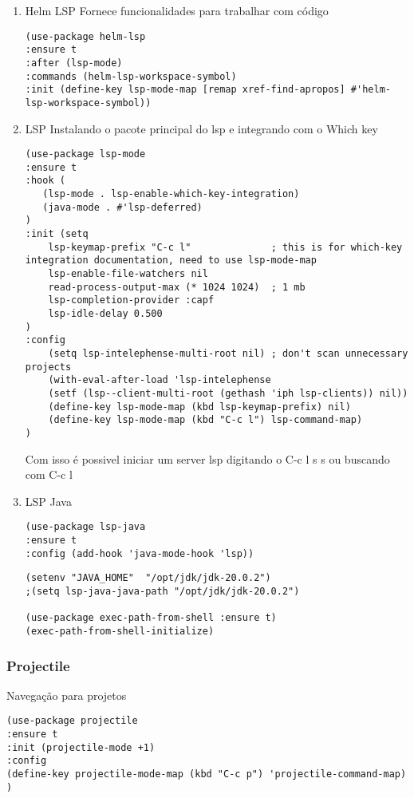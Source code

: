 \documentclass[11pt]{article}
\begin{document}
\begin{enumerate}
\item Helm LSP
\label{sec:org93d8a4e}
Fornece funcionalidades para trabalhar com código
\begin{verbatim}
(use-package helm-lsp
:ensure t
:after (lsp-mode)
:commands (helm-lsp-workspace-symbol)
:init (define-key lsp-mode-map [remap xref-find-apropos] #'helm-lsp-workspace-symbol))
\end{verbatim}

\item LSP
\label{sec:orgee78687}
Instalando o pacote principal do lsp e integrando com o Which key
\begin{verbatim}
(use-package lsp-mode
:ensure t
:hook (
   (lsp-mode . lsp-enable-which-key-integration)
   (java-mode . #'lsp-deferred)
)
:init (setq 
    lsp-keymap-prefix "C-c l"              ; this is for which-key integration documentation, need to use lsp-mode-map
    lsp-enable-file-watchers nil
    read-process-output-max (* 1024 1024)  ; 1 mb
    lsp-completion-provider :capf
    lsp-idle-delay 0.500
)
:config 
    (setq lsp-intelephense-multi-root nil) ; don't scan unnecessary projects
    (with-eval-after-load 'lsp-intelephense
    (setf (lsp--client-multi-root (gethash 'iph lsp-clients)) nil))
	(define-key lsp-mode-map (kbd lsp-keymap-prefix) nil)
	(define-key lsp-mode-map (kbd "C-c l") lsp-command-map)
)
\end{verbatim}
Com isso é possivel iniciar um server lsp digitando o C-c l s s ou buscando com C-c l

\item LSP Java
\label{sec:org9a444b8}
\begin{verbatim}
(use-package lsp-java 
:ensure t
:config (add-hook 'java-mode-hook 'lsp))
\end{verbatim}


\begin{verbatim}
(setenv "JAVA_HOME"  "/opt/jdk/jdk-20.0.2")
;(setq lsp-java-java-path "/opt/jdk/jdk-20.0.2")

(use-package exec-path-from-shell :ensure t)
(exec-path-from-shell-initialize)
\end{verbatim}
\end{enumerate}

\subsubsection{Projectile}
\label{sec:org5f4a882}
Navegação para projetos
\begin{verbatim}
(use-package projectile 
:ensure t
:init (projectile-mode +1)
:config 
(define-key projectile-mode-map (kbd "C-c p") 'projectile-command-map)
)   
\end{verbatim}
\end{document}
